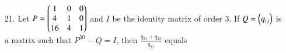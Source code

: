 \documentclass[journal,12pt,twocolumn]{IEEEtran}
\theoremstyle{remark}
\begin{document}
\begin{enumerate}
		\item[21.] Let $P=\begin{pmatrix}1&0&0\\4&1&0\\16&4&1\end{pmatrix}$ and $I$ be the identity matrix of order 3. If $Q = \begin{pmatrix}q_{ij}\end{pmatrix}$ is a matrix such that $P^{50} -Q =I$, then $\frac{q_{31}+q_{32}}{q_{21}}$ equals
	\hfill{}
			\begin{enumerate}
					
			\end{enumerate}
\end{enumerate}
\end{document}
